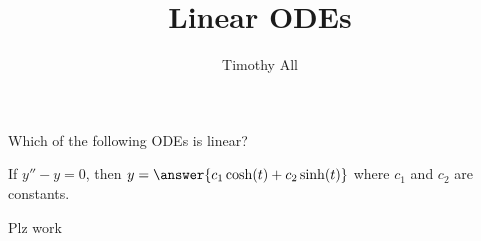 \documentclass{ximera}%
\title{Linear ODEs}
\author{Timothy All}
\begin{document}
\maketitle



\begin{problem} Which of the following ODEs is linear?
\begin{multipleChoice}
\end{multipleChoice}
\end{problem}

\begin{problem}
   If $y'' - y = 0$, then $y = \answer{c_1 \cosh(t) + c_2 \sinh(t)}$ where $c_1$ and $c_2$ are constants.
\end{problem}









Plz work
\end{document}
